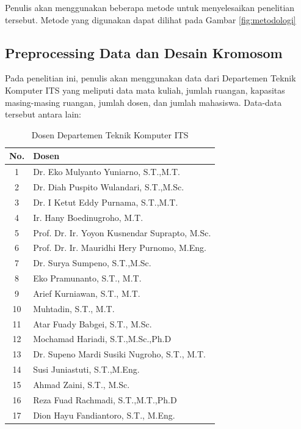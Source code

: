 Penulis akan menggunakan beberapa metode untuk menyelesaikan penelitian tersebut. 
Metode yang digunakan dapat dilihat pada Gambar \ref*{fig:metodologi}

\subsection{Preprocessing Data dan Desain Kromosom}
  
  Pada penelitian ini, penulis akan menggunakan data dari Departemen Teknik Komputer ITS yang meliputi data mata kuliah, 
  jumlah ruangan, kapasitas masing-masing ruangan, jumlah dosen, dan jumlah mahasiswa. Data-data tersebut antara lain:
  \begin{longtable}{|c|l|}
    \caption{Dosen Departemen Teknik Komputer ITS}
    \label{tb:DosenTekkom} \\
    \hline
    \rowcolor[HTML]{C0C0C0} 
    No. & Dosen                                         \\ \hline
    1   & Dr. Eko Mulyanto Yuniarno, S.T.,M.T.          \\ 
    2   & Dr. Diah Puspito Wulandari, S.T.,M.Sc.        \\ 
    3   & Dr. I Ketut Eddy Purnama, S.T.,M.T.           \\ 
    4   & Ir. Hany Boedinugroho, M.T.                   \\ 
    5   & Prof. Dr. Ir. Yoyon Kusnendar Suprapto, M.Sc. \\ 
    6   & Prof. Dr. Ir. Mauridhi Hery Purnomo, M.Eng.   \\ 
    7   & Dr. Surya Sumpeno, S.T.,M.Sc.                 \\ 
    8   & Eko Pramunanto, S.T., M.T.                    \\ 
    9   & Arief Kurniawan, S.T., M.T.                   \\ 
    10  & Muhtadin, S.T., M.T.                          \\ 
    11  & Atar Fuady Babgei, S.T., M.Sc.                \\ 
    12  & Mochamad Hariadi, S.T.,M.Sc.,Ph.D             \\ 
    13  & Dr. Supeno Mardi Susiki Nugroho, S.T., M.T.   \\ 
    14  & Susi Juniastuti, S.T.,M.Eng.                  \\ 
    15  & Ahmad Zaini, S.T., M.Sc.                      \\ 
    16  & Reza Fuad Rachmadi, S.T.,M.T.,Ph.D            \\ 
    17  & Dion Hayu Fandiantoro, S.T., M.Eng.           \\ 
    \hline
  \end{longtable}

